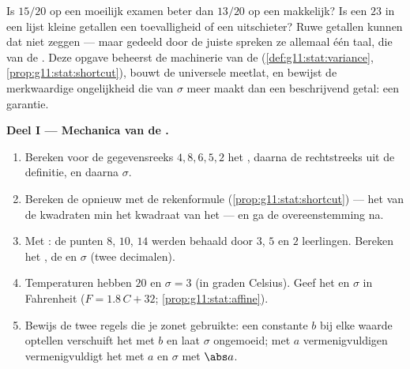 \begin{problem}
\label{pb:g11:stat:1}
Is $15/20$ op een moeilijk examen beter dan $13/20$ op een makkelijk? Is een
$23$ in een lijst kleine getallen een toevalligheid of een uitschieter? Ruwe
getallen kunnen dat niet zeggen --- maar gedeeld door de juiste
 spreken ze allemaal één taal, die van de
\emph{}. Deze opgave beheerst de machinerie van de 
(\cref{def:g11:stat:variance}, \cref{prop:g11:stat:shortcut}), bouwt de
universele meetlat, en bewijst de merkwaardige ongelijkheid die van $\sigma$
meer maakt dan een beschrijvend getal: een garantie.

\medskip
\noindent\textbf{Deel I --- Mechanica van de .}
\begin{enumerate}
  \item Bereken voor de gegevensreeks $4, 8, 6, 5, 2$ het , daarna
        de  rechtstreeks uit de definitie, en daarna $\sigma$.
  \item Bereken de  opnieuw met de rekenformule
        (\cref{prop:g11:stat:shortcut}) --- het  van de kwadraten
        min het kwadraat van het  --- en ga de overeenstemming na.
  \item Met : de punten $8$, $10$, $14$ werden behaald door $3$,
        $5$ en $2$ leerlingen. Bereken het , de  en
        $\sigma$ (twee decimalen).
  \item Temperaturen hebben  $20$ en $\sigma = 3$ (in graden
        Celsius). Geef het  en $\sigma$ in Fahrenheit
        ($F = 1.8\,C + 32$; \cref{prop:g11:stat:affine}).
  \item Bewijs de twee regels die je zonet gebruikte: een constante $b$ bij
        elke waarde optellen verschuift het  met $b$ en laat
        $\sigma$ ongemoeid; met $a$ vermenigvuldigen vermenigvuldigt het
         met $a$ en $\sigma$ met $\abs a$.
\end{enumerate}


\end{problem}
